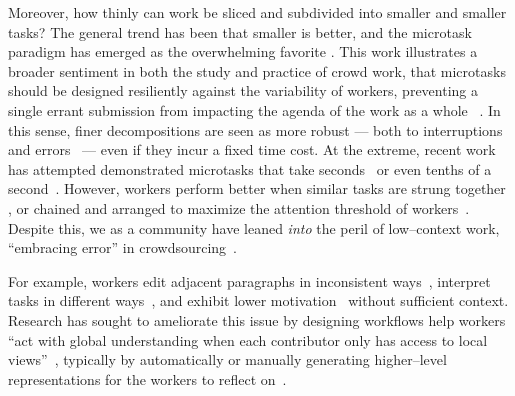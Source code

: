 \documentclass[trackingWork]{subfiles}
\begin{document}
Moreover, how thinly can work be sliced and subdivided into smaller and smaller tasks? 
The general trend has been that smaller is better, and the microtask paradigm has emerged as the overwhelming favorite
\cite{selfsourcingTeevan2014,selfsourcingTeevan2016}.
This work illustrates a broader sentiment in both the study and practice
of crowd work, that microtasks should be designed resiliently against the variability of workers, preventing a single errant submission from impacting the agenda of the work as a whole %
~\cite{interruptionIqbal,delayAndOrderLasecki,vaish2014low}.
In this sense, finer decompositions are seen as more robust --- both to interruptions and errors~\cite{cheng2015break} --- even if they incur a fixed time cost.
At the extreme, recent work has attempted demonstrated microtasks that take seconds~\cite{Vaish:2014:TCC:2611222.2556996,Cai:2015:WLW:2702123.2702267} or even tenths of a second~\cite{embracingErrorKrishna}.
However, workers perform better when similar tasks are strung together 
\cite{delayAndOrderLasecki}, or chained and arranged to maximize  the attention threshold of workers~\cite{Cai:2016:CRI:2858036.2858237}.
Despite this, 
we as a community have leaned \textit{into} the peril of
low--context work, ``embracing error'' in crowdsourcing~\cite{embracingErrorKrishna}.


For example, workers edit adjacent paragraphs in inconsistent ways~\cite{bernsteinSoylent,Kim2017}, interpret tasks in different ways~\cite{kairam2016parting}, and exhibit lower motivation~\cite{Kinnaird:2012:WTM:2389176.2389219} without sufficient context.
Research has sought to ameliorate this issue by designing workflows help workers ``act with global understanding when each contributor only has access to local views''~\cite{verroios2014context}, typically by automatically or manually generating higher--level representations for the workers to reflect on~\cite{chilton2013cascade,verroios2014context,Kim2017}.
\end{document}
